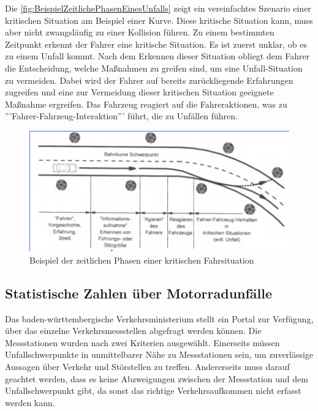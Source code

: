Die \autoref{fig:BeispielZeitlichePhasenEinesUnfalls} zeigt ein vereinfachtes Szenario einer kritischen Situation am Beispiel einer Kurve. Diese kritische Situation kann, muss aber nicht zwangsläufig zu einer Kollision führen. Zu einem bestimmten Zeitpunkt erkennt der Fahrer eine kritische Situation. Es ist zuerst unklar, ob es zu einem Unfall kommt. Nach dem Erkennen dieser Situation obliegt dem Fahrer die Entscheidung, welche Maßnahmen zu greifen sind, um eine Unfall-Situation zu vermeiden. Dabei wird der Fahrer auf bereits zurückliegende Erfahrungen zugreifen und eine zur Vermeidung dieser kritischen Situation geeignete Maßnahme ergreifen. Das Fahrzeug reagiert auf die Fahreraktionen, was zu '''Fahrer-Fahrzeug-Interaktion''' führt, die zu Unfällen führen.\citep{Appel2002}\\


\begin{figure}
	\centering
	\includegraphics[width=\linewidth]{Bilder/BeispielZeitlichePhasenEinesUnfalls.png} %
	\caption{Beispiel der zeitlichen Phasen einer kritischen Fahrsituation \citep{Appel2002}}
	\label{fig:BeispielZeitlichePhasenEinesUnfalls}
\end{figure}

%
%
%
%
%

\subsection{Statistische Zahlen über Motorradunfälle}
Das baden-württembergische Verkehrsministerium stellt ein Portal zur Verfügung, über das einzelne Verkehrsmessstellen abgefragt werden können. Die Messstationen wurden nach zwei Kriterien ausgewählt. Einerseits müssen Unfallschwerpunkte in unmittelbarer Nähe zu Messstationen sein, um zuverlässige Aussagen über Verkehr und Störstellen zu treffen.
Andererseits muss darauf geachtet werden, dass es keine Abzweigungen zwischen der Messstation und dem Unfallschwerpunkt gibt, da sonst das richtige Verkehrsaufkommen nicht erfasst werden kann.

